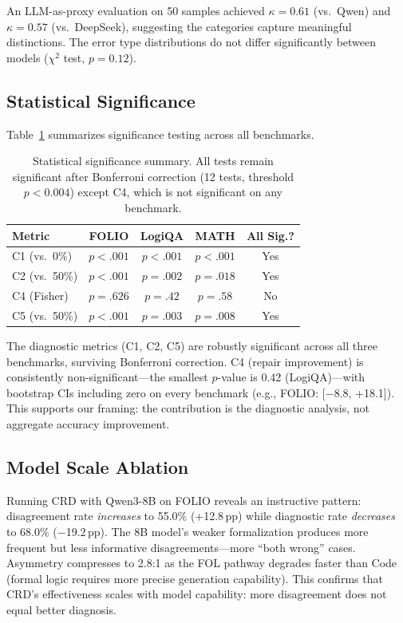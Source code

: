 \documentclass[11pt,a4paper]{article}
\newcommand{\method}{CRD}
\newcommand{\pp}{\,pp}
\begin{document}
An LLM-as-proxy evaluation on 50 samples achieved $\kappa{=}0.61$ (vs.\ Qwen) and $\kappa{=}0.57$ (vs.\ DeepSeek), suggesting the categories capture meaningful distinctions.
The error type distributions do not differ significantly between models ($\chi^2$ test, $p{=}0.12$).

\subsection{Statistical Significance}
\label{sec:stats}

Table~\ref{tab:stats} summarizes significance testing across all benchmarks.

\begin{table}[t]
\centering
\small
\begin{tabular}{lcccc}
\toprule
\textbf{Metric} & \textbf{FOLIO} & \textbf{LogiQA} & \textbf{MATH} & \textbf{All Sig.?} \\
\midrule
C1 (vs.\ 0\%) & $p{<}.001$ & $p{<}.001$ & $p{<}.001$ & Yes \\
C2 (vs.\ 50\%) & $p{<}.001$ & $p{=}.002$ & $p{=}.018$ & Yes \\
C4 (Fisher) & $p{=}.626$ & $p{=}.42$ & $p{=}.58$ & No \\
C5 (vs.\ 50\%) & $p{<}.001$ & $p{=}.003$ & $p{=}.008$ & Yes \\
\bottomrule
\end{tabular}
\caption{Statistical significance summary. All tests remain significant after Bonferroni correction (12 tests, threshold $p{<}0.004$) except C4, which is not significant on any benchmark.}
\label{tab:stats}
\end{table}

The diagnostic metrics (C1, C2, C5) are robustly significant across all three benchmarks, surviving Bonferroni correction.
C4 (repair improvement) is consistently non-significant---the smallest $p$-value is 0.42 (LogiQA)---with bootstrap CIs including zero on every benchmark (e.g., FOLIO: [$-$8.8, +18.1]).
This supports our framing: the contribution is the diagnostic analysis, not aggregate accuracy improvement.

\subsection{Model Scale Ablation}

Running \method{} with Qwen3-8B on FOLIO reveals an instructive pattern: disagreement rate \emph{increases} to 55.0\% (+12.8\pp{}) while diagnostic rate \emph{decreases} to 68.0\% ($-$19.2\pp{}).
The 8B model's weaker formalization produces more frequent but less informative disagreements---more ``both wrong'' cases.
Asymmetry compresses to 2.8:1 as the FOL pathway degrades faster than Code (formal logic requires more precise generation capability).
This confirms that \method{}'s effectiveness scales with model capability: more disagreement does not equal better diagnosis.
\end{document}
